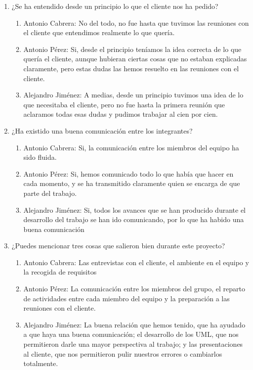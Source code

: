 \begin{enumerate}
    \item ¿Se ha entendido desde un principio lo que el cliente nos ha pedido?
    \begin{enumerate}
        \item Antonio Cabrera: No del todo, no fue hasta que tuvimos las reuniones con el cliente que entendimos realmente lo que quería.
        \item Antonio Pérez: Si, desde el principio teníamos la idea correcta de lo que quería el cliente, aunque hubieran ciertas cosas que no estaban explicadas claramente, pero estas dudas las hemos resuelto en las reuniones con el cliente.
        \item Alejandro Jiménez: A medias, desde un principio tuvimos una idea de lo que necesitaba el cliente, pero no fue hasta la primera reunión que aclaramos todas esas dudas y pudimos trabajar al cien por cien.
    \end{enumerate}

    \item ¿Ha existido una buena comunicación entre los integrantes?
    \begin{enumerate}
        \item Antonio Cabrera: Si, la comunicación entre los miembros del equipo ha sido fluida.
        \item Antonio Pérez: Si, hemos comunicado todo lo que había que hacer en cada momento, y se ha transmitido claramente quien se encarga de que parte del trabajo.
        \item Alejandro Jiménez: Si, todos los avances que se han producido durante el desarrollo del trabajo se han ido comunicando, por lo que ha habido una buena comunicación
    \end{enumerate}

    \item ¿Puedes mencionar tres cosas que salieron bien durante este proyecto?
    \begin{enumerate}
        \item Antonio Cabrera: Las entrevistas con el cliente, el ambiente en el equipo y la recogida de requisitos
        \item Antonio Pérez: La comunicación entre los miembros del grupo, el reparto de actividades entre cada miembro del equipo y la preparación a las reuniones con el cliente.
        \item Alejandro Jiménez: La buena relación que hemos tenido, que ha ayudado a que haya una buena comunicación; el desarrollo de los UML, que nos permitieron darle una mayor perspectiva al trabajo; y las presentaciones al cliente, que nos permitieron pulir nuestros errores o cambiarlos totalmente.
    \end{enumerate}


\end{enumerate}
